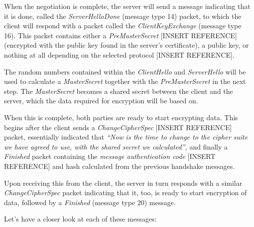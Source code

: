 When the negotiation is complete, the server will send a message indicating that it is done, called the \textit{ServerHelloDone} (message type 14) packet, to which the client will respond with a packet called the \textit{ClientKeyExchange }(message type 16). This packet contains either a \textit{PreMasterSecret }[INSERT REFERENCE] (encrypted with the public key found in the server's certificate), a public key, or nothing at all depending on the selected protocol [INSERT REFERENCE].

The random numbers contained within the \textit{ClientHello }and \textit{ServerHello }will be used to calculate a \textit{MasterSecret} together with the \textit{PreMasterSecret }in the next step. The \textit{MasterSecret }becomes a shared secret between the client and the server, which the data required for encryption will be based on.

When this is complete, both parties are ready to start encrypting data. This begins after the client sends a \textit{ChangeCipherSpec }[INSERT REFERENCE] packet, essentially indicated that \textit{{\textquotedblleft}Now is the time to change to the cipher suite we have agreed to use, with the shared secret we calculated{\textquotedblright}, }and finally a \textit{Finished }packet containing the \textit{message authentication code} [INSERT REFERENCE] and hash calculated from the previous handshake messages.

Upon receiving this from the client, the server in turn responds with a similar \textit{ChangeCipherSpec }packet indicating that it, too, is ready to start encryption of data, followed by a \textit{Finished} (message type 20) message.

Let's have a closer look at each of these messages:

